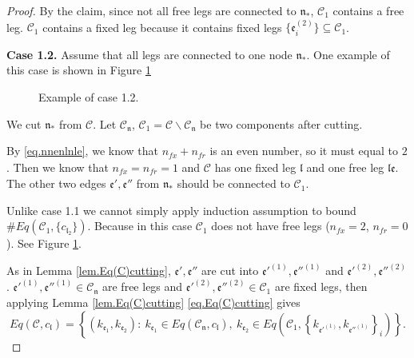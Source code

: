 \begin{proof}
By the claim, since not all free legs are connected to $\mathfrak{n}_*$, $\mathcal{C}_1$ contains a free leg. $\mathcal{C}_1$ contains a fixed leg because it contains fixed legs $\{\mathfrak{e}_{i}^{(2)}\}\subseteq \mathcal{C}_1$.

\textbf{Case 1.2.} Assume that all legs are connected to one node $\mathfrak{n}_*$. One example of this case is shown in Figure \ref{fig.examplecase1.2}

\begin{figure}[H]
    \centering
    \caption{Example of case 1.2.}
    \label{fig.examplecase1.2}
\end{figure}

We cut $\mathfrak{n}_*$ from $\mathcal{C}$. Let $\mathcal{C}_{\mathfrak{n}}$, $\mathcal{C}_1=\mathcal{C}\backslash \mathcal{C}_{\mathfrak{n}}$ be two components after cutting.

By \eqref{eq.nnenlnle}, we know that $n_{\textit{fx}}+n_{\textit{fr}}$ is an even number, so it must equal to $2$. Then we know that $n_{\textit{fx}}=n_{\textit{fr}}=1$ and $\mathcal{C}$ has one fixed leg $\mathfrak{l}$ and one free leg $\mathfrak{l}\mathfrak{e}$. The other two edges $\mathfrak{e}', \mathfrak{e}''$ from $\mathfrak{n}_*$ should be connected to $\mathcal{C}_1$.

Unlike case 1.1 we cannot simply apply induction assumption to bound $\# Eq(\mathcal{C}_1, \{c_{\mathfrak{l}_2}\})$. Because in this case $\mathcal{C}_1$ does not have free legs ($n_{\textit{fx}}=2$, $n_{\textit{fr}}=0$). See Figure \ref{fig.examplecase1.2}.

As in Lemma \ref{lem.Eq(C)cutting}, $\mathfrak{e}', \mathfrak{e}''$ are cut into $\mathfrak{e}'^{(1)}, \mathfrak{e}''^{(1)}$
and $\mathfrak{e}'^{(2)}, \mathfrak{e}''^{(2)}$. $\mathfrak{e}'^{(1)}, \mathfrak{e}''^{(1)}\in \mathcal{C}_{\mathfrak{n}}$ are free legs and $\mathfrak{e}'^{(2)}, \mathfrak{e}''^{(2)}\in \mathcal{C}_1$ are fixed legs, then applying Lemma \ref{lem.Eq(C)cutting} \eqref{eq.Eq(C)cutting} gives
\begin{equation}
    Eq(\mathcal{C},c_{\mathfrak{l}})=\left\{(k_{\mathfrak{e}_1},k_{\mathfrak{e}_{2}}):\ k_{\mathfrak{e}_1}\in Eq(\mathcal{C}_{\mathfrak{n}},c_{\mathfrak{l}}),\  k_{\mathfrak{e}_{2}}\in Eq\left(\mathcal{C}_1, \left\{k_{\mathfrak{e}'^{(1)}}, k_{\mathfrak{e}''^{(1)}}\right\}_{i}\right)\right\}.
\end{equation}


\end{proof}

